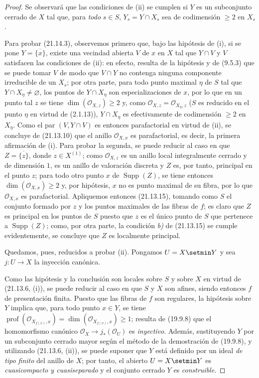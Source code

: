 \begin{proof}
Se observará que las condiciones de (ii) se cumplen si $Y$ es un subconjunto cerrado de $X$
tal que, para \emph{todo} $s\in S$, $Y_s=Y\cap X_s$ sea de codimensión $\geq2$ en
$X_s$.

Para probar (21.14.3), observemos primero que, bajo las hipótesis de (i), si 
se pone
$Y=\overline{\{x\}}$, existe una vecindad abierta $V$ de $x$ en $X$ tal que
$Y\cap V$ y $V$ satisfacen las condiciones de (ii): en efecto, resulta de la hipótesis
y de (9.5.3) que se puede tomar $V$ de modo que $V\cap Y$ no contenga ninguna
componente irreducible de un $X_s$; por otra parte, para todo punto maximal $\eta$ de
$S$ tal que $Y\cap X_\eta\neq\varnothing$, los puntos de $Y\cap X_\eta$ son
especializaciones de $x$, por lo que en un punto tal $z$ se tiene
$\dim(\mathcal O_{X,z})\geq2$ y, como
$\mathcal O_{X,z}=\mathcal O_{X_\eta,z}$ ($S$ es reducido en el punto $\eta$ en virtud
de (2.1.13)), $Y\cap X_\eta$ es efectivamente de codimensión $\geq2$ en $X_\eta$. Como el
par $(V,Y\cap V)$ es entonces parafactorial en virtud de (ii), se concluye de (21.13.10)
que el anillo $\mathcal O_{X,x}$ es parafactorial, es decir, la primera afirmación
de (i). Para probar la segunda, se puede reducir al caso en que
$Z=\overline{\{z\}}$, donde $z\in X^{(1)}$; como $\mathcal O_{X,z}$ es un anillo local
integralmente cerrado y de dimensión $1$, es un anillo de valoración discreta y $Z$
es, por tanto, principal en el punto $z$; para todo otro punto $x$ de
$\operatorname{Supp}(Z)$, se tiene entonces $\dim(\mathcal O_{X,x})\geq2$ y, por hipótesis, $x$ no es
punto maximal de su fibra, por lo que $\mathcal O_{X,x}$ es parafactorial.
Apliquemos entonces (21.13.15), tomando como $S$ el conjunto formado por $z$ y los puntos
maximales de las fibras de $f$; es claro que $Z$ es principal en los puntos de $S$
puesto que $z$ es el único punto de $S$ que pertenece a $\operatorname{Supp}(Z)$; como,
por otra parte, la condición \emph{b)} de (21.13.15) se cumple evidentemente, se concluye que
$Z$ es localmente principal.

Quedamos, pues, reducidos a probar (ii). Pongamos $U=X\setmin Y$ y sea $j:U\to X$ la inyección
canónica.

Como las hipótesis y la conclusión son locales sobre $S$ y sobre $X$ en virtud de
(21.13.6, (i)), se puede reducir al caso en que $S$ y $X$ son afines, siendo entonces $f$ de
presentación finita. Puesto que las fibras de $f$ son regulares, la hipótesis sobre $Y$
implica que, para todo punto $x\in Y$, se tiene
$\operatorname{prof}(\mathcal O_{X_{f(x)},x})=\dim(\mathcal O_{X_{f(x)},x})\geq1$;
resulta de (19.9.8) que el homomorfismo canónico
$\mathcal O_X\to j_*(\mathcal O_U)$ es \emph{inyectivo}. Además, sustituyendo $Y$ por
un subconjunto cerrado mayor según el método de la demostración de (19.9.8), y
utilizando (21.13.6, (ii)), se puede suponer que $Y$ está definido por un ideal \emph{de
tipo finito} del anillo de $X$; por tanto, el abierto $U=X\setmin Y$ es \emph{cuasicompacto y
cuasiseparado} y el conjunto cerrado $Y$ es \emph{construible}.


\end{proof}
